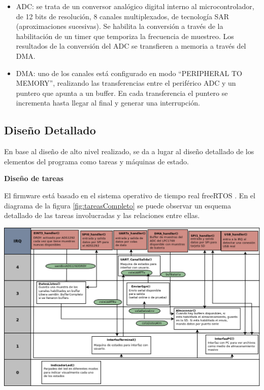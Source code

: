 \begin{itemize}
	\item ADC: se trata de un conversor analógico digital interno al microcontrolador, de 12 bits de resolución, 8 canales multiplexados, de tecnología SAR (aproximaciones sucesivas). Se habilita la conversión a través de la habilitación de un timer que temporiza la frecuencia de muestreo. Los resultados de la conversión del ADC se transfieren a memoria a través del DMA.
	\item DMA: uno de los canales está configurado en modo “PERIPHERAL TO MEMORY”, realizando las transferencias entre el periférico ADC y un puntero que apunta a un buffer. En cada transferencia el puntero se incrementa hasta llegar al final y generar una interrupción. 
\end{itemize}

\subsection{Diseño Detallado} \label{disDetallado}

En base al diseño de alto nivel realizado, se da a lugar al diseño detallado de los elementos del programa como tareas y máquinas de estado.

\textbf{Diseño de tareas}

El firmware está basado en el sistema operativo de tiempo real freeRTOS \citep{aws2017}.  En el diagrama de la figura \ref{fig:tareasCompleto} se puede observar un esquema detallado de las tareas involucradas y las relaciones entre ellas. 

\begin{adjustbox}{center,caption={Diagrama de tareas completo},label={fig:tareasCompleto},nofloat=figure,vspace=\bigskipamount}
\includegraphics[scale = 0.35, angle=90]{./Figures/VOP24_tareas_v1.png}
\label{tareasCompleto}
\end{adjustbox}

